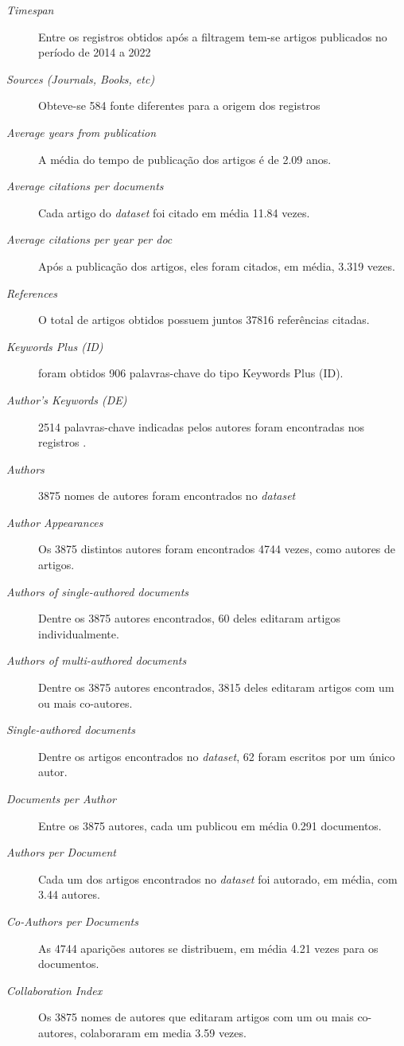 \begin{description}
    \item [\textit{Timespan}] Entre os registros obtidos após a filtragem tem-se artigos publicados no período de 2014 a 2022
    \item [\textit{Sources (Journals, Books, etc)}] Obteve-se 584 fonte diferentes para a origem dos registros
    \item [\textit{Average years from publication}] A média do tempo de publicação dos artigos é de 2.09 anos.
    \item [\textit{Average citations per documents}] Cada artigo do \textit{dataset} foi citado em média 11.84 vezes.
    \item [\textit{Average citations per year per doc}] Após a publicação dos artigos, eles foram citados, em média, 3.319 vezes.
    \item [\textit{References}] O total de artigos obtidos possuem juntos 37816 referências citadas.
    \item [\textit{Keywords Plus (ID)}] foram obtidos 906 palavras-chave do tipo Keywords Plus (ID).
    \item [\textit{Author's Keywords (DE)}] 2514 palavras-chave indicadas pelos autores foram encontradas nos registros  .
    \item [\textit{Authors}] 3875 nomes de autores foram encontrados no \textit{dataset}  
    \item [\textit{Author Appearances}] Os 3875 distintos autores foram encontrados 4744 vezes, como autores de artigos.
    \item [\textit{Authors of single-authored documents}] Dentre os 3875 autores encontrados, 60 deles editaram artigos individualmente.
    \item [\textit{Authors of multi-authored documents}] Dentre os 3875 autores encontrados, 3815 deles editaram artigos com um ou mais co-autores.
    \item [\textit{Single-authored documents}] Dentre os artigos encontrados no \textit{dataset}, 62 foram escritos por um único autor.
    \item [\textit{Documents per Author}] Entre os 3875 autores, cada um publicou em média 0.291 documentos.
    \item [\textit{Authors per Document}] Cada um dos artigos encontrados no \textit{dataset} foi autorado, em média, com 3.44 autores.
    \item [\textit{Co-Authors per Documents}] As 4744 aparições autores se distribuem, em média 4.21 vezes para os documentos.
    \item [\textit{Collaboration Index}] Os 3875 nomes de autores que editaram artigos com um ou mais co-autores, colaboraram em media 3.59 vezes.
\end{description}